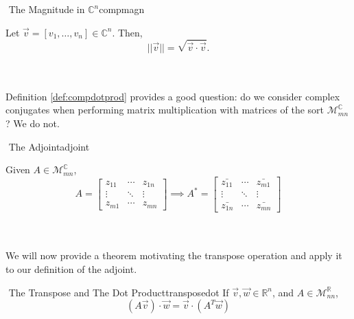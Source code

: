         \begin{definition}{\Stop\,\,The Magnitude in \(\mathbb{C}^n\)}{compmagn}

            Let \(\vec{v}=[v_1,\ldots,v_n]\in\mathbb{C}^n\). Then,
            \begin{equation*}
                ||\vec{v}||=\sqrt{\vec{v}\cdot\vec{v}}.
            \end{equation*}

        \end{definition}
        \vphantom
        \\
        \\
        Definition \ref{def:compdotprod} provides a good question: do we consider complex conjugates when performing matrix multiplication with matrices of the sort \(\mathcal{M}_{mn}^\mathbb{C}\)? We do not.
        \begin{definition}{\Stop\,\,The Adjoint}{adjoint}

            Given \(A\in\mathcal{M}_{mn}^\mathbb{C}\), 
            \begin{equation*}
                A=\begin{bmatrix}
                    z_{11} & \cdots & z_{1n} \\
                    \vdots & \ddots & \vdots \\
                    z_{m1} & \cdots & z_{mn}
                \end{bmatrix}
                \implies 
                A^*=\begin{bmatrix}
                    \bar{z_{11}} & \cdots & \bar{z_{m1}} \\
                    \vdots & \ddots & \vdots \\
                    \bar{z_{1n}} & \cdots & \bar{z_{mn}}
                \end{bmatrix}
            \end{equation*}

        \end{definition}
        \vphantom
        \\
        \\
        We will now provide a theorem motivating the transpose operation and apply it to our definition of the adjoint.
        \begin{theorem}{\Stop\,\,The Transpose and The Dot Product}{transposedot}
            If \(\vec{v},\vec{w}\in\mathbb{R}^n\), and \(A\in\mathcal{M}_{nn}^\mathbb{R}\), 
            \begin{equation*}
                (A\vec{v})\cdot\vec{w}=\vec{v}\cdot(A^T\vec{w})
            \end{equation*}
        \end{theorem}
